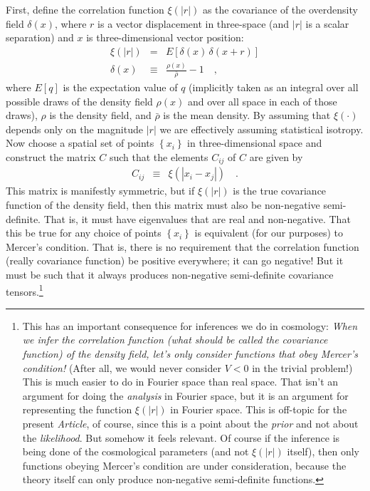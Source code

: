 \documentclass[12pt, letterpaper, preprint]{aastex}
\newcommand{\setof}[1]{\left\{{#1}\right\}}
\newcommand{\documentname}{\textsl{Article}}
\begin{document}
First, define the correlation function $\xi(|r|)$ as the covariance of
the overdensity field $\delta(x)$, where $r$ is a vector displacement
in three-space (and $|r|$ is a scalar separation) and $x$ is
three-dimensional vector position:
\begin{eqnarray}
\xi(|r|) &=& E[\delta(x)\,\delta(x+r)]
\\
\delta(x) &\equiv& \frac{\rho(x)}{\bar{\rho}} - 1
\quad ,
\end{eqnarray}
where $E[q]$ is the expectation value of $q$ (implicitly taken as an integral
over all possible draws of the density field $\rho(x)$ and over all space in each of those draws),
$\rho$ is the density field,
and $\bar{\rho}$ is the mean density.
By assuming that $\xi(\cdot)$ depends only on the magnitude $|r|$ we are effectively
assuming statistical isotropy.
Now choose a spatial set of points $\setof{x_i}$ in three-dimensional space
and construct the matrix $C$ such that the elements $C_{ij}$ of $C$
are given by
\begin{eqnarray}
C_{ij} &\equiv& \xi(|x_i - x_j|)
\quad .
\end{eqnarray}
This matrix is manifestly symmetric, but if $\xi(|r|)$ is the true
covariance function of the density field, then this matrix must also
be non-negative semi-definite.
That is, it must have eigenvalues that are real and non-negative.
That this be true for any choice of points $\setof{x_i}$ is equivalent
(for our purposes) to Mercer's condition.
That is, there is no requirement that the correlation function (really
covariance function) be positive everywhere; it can go negative!
But it must be such that it always produces non-negative semi-definite
covariance tensors.\footnote{This has an important consequence for
  inferences we do in cosmology: \emph{When we infer the correlation
    function (what should be called the covariance function) of the
    density field, let's only consider functions that obey Mercer's
    condition!}  (After all, we would never consider $V<0$ in the
  trivial problem!)  This is much easier to do in Fourier space than
  real space.  That isn't an argument for doing the \emph{analysis} in
  Fourier space, but it is an argument for representing the function
  $\xi(|r|)$ in Fourier space. This is off-topic for the present
  \documentname, of course, since this is a point about the
  \emph{prior} and not about the \emph{likelihood}. But somehow it
  feels relevant. Of course if the inference is being done of the
  cosmological parameters (and not $\xi(|r|)$ itself), then only
  functions obeying Mercer's condition are under consideration,
  because the theory itself can only produce non-negative
  semi-definite functions.}
\end{document}
